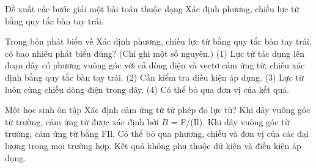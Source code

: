 \begin{bt}
Đề xuất các bước giải một bài toán thuộc dạng Xác định phương, chiều lực từ bằng quy tắc bàn tay trái.
\end{bt}

\begin{ex}
Trong bốn phát biểu về Xác định phương, chiều lực từ bằng quy tắc bàn tay trái, có bao nhiêu phát biểu đúng? (Chỉ ghi một số nguyên.) (1) Lực từ tác dụng lên đoạn dây có phương vuông góc với cả dòng điện và vectơ cảm ứng từ; chiều xác định bằng quy tắc bàn tay trái. (2) Cần kiểm tra điều kiện áp dụng. (3) Lực từ luôn cùng chiều dòng điện trong dây. (4) Có thể bỏ qua đơn vị của kết quả.
\end{ex}

\begin{ex}
Một học sinh ôn tập Xác định cảm ứng từ từ phép đo lực từ?
\choice
{\True Khi dây vuông góc từ trường, cảm ứng từ được xác định bởi $B$ = F/(Il).}
{Khi dây vuông góc từ trường, cảm ứng từ bằng FIl.}
{Có thể bỏ qua phương, chiều và đơn vị của các đại lượng trong mọi trường hợp.}
{Kết quả không phụ thuộc dữ kiện và điều kiện áp dụng.}
\end{ex}

